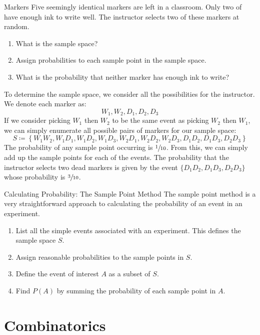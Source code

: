 \begin{exbox}{Markers}{}
    Five seemingly identical markers are left in a classroom. Only two of have enough ink to write well. The instructor selects two of these markers at random.
    \begin{enumerate}
        \item What is the sample space?
        \item Assign probabilities to each sample point in the sample space.
        \item What is the probability that neither marker has enough ink to write?
    \end{enumerate}
    \tcblower
    To determine the sample space, we consider all the possibilities for the instructor. We denote each marker as:
    \[ W_1, W_2, D_1, D_2, D_3 \]
    If we consider picking $W_1$ then $W_2$ to be the same event as picking $W_2$ then $W_1$, we can simply enumerate all possible pairs of markers for our sample space:
    \[ S \coloneq \left\{ W_1W_2, W_1D_1, W_1D_2, W_1D_3, W_2D_1, W_2D_2, W_2D_3, D_1D_2, D_1D_3, D_2D_3 \right\} \]
    The probability of any sample point occurring is $\sfrac{1}{10}$. From this, we can simply add up the sample points for each of the events. The probability that the instructor selects two dead markers is given by the event $\{D_1D_2, D_1D_3, D_2D_3\}$ whose probability is $\sfrac{3}{10}$.
\end{exbox}

\begin{tecbox}{Calculating Probability: The Sample Point Method}{}
    The sample point method is a very straightforward approach to calculating the probability of an event in an experiment.
    \begin{enumerate}
        \item List all the simple events associated with an experiment. This defines the sample space $S$.
        \item Assign reasonable probabilities to the sample points in $S$.
        \item Define the event of interest $A$ as a subset of $S$.
        \item Find $P(A)$ by summing the probability of each sample point in $A$.
    \end{enumerate}
\end{tecbox}

\section{Combinatorics}

